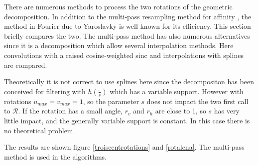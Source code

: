 
There are numerous methods to process the two rotations of the geometric decomposition. In addition to the multi-pass resampling method for affinity \cite{szeliski2010high}, the method in Fourier due to Yaroslavky \cite{unser1995convolution} is well-known for its efficiency. This section briefly compares the two. The multi-pass method has also numerous alternatives since it is a decomposition which allow several interpolation methods. Here convolutions with a raised cosine-weighted sinc and interpolations with splines are compared.





Theoretically it is not correct to use splines here since the decompositon has been conceived for filtering with $h(\frac{\dot{}}{s})$ which has a variable support. However with rotations $u_{max}=v_{max}=1$, so the parameter $s$ does not impact the two first call to $\mathcal R$. If the rotation has a small angle, $r_v$ and $r_h$ are close to 1, so $s$ has very little impact, and the generally variable support is constant. In this case there is no theoretical problem.

The results are shown figure \ref{troiscentrotations} and \ref{rotalena}. The multi-pass method is used in the algorithms.


